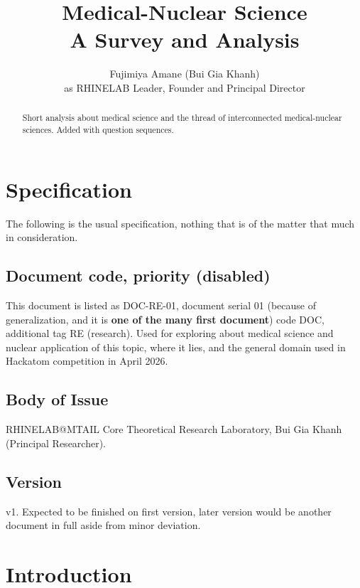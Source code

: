 \documentclass[9pt,a4paper]{article}
\title{\textbf{Medical-Nuclear Science \\ A Survey and Analysis}} %
\author{Fujimiya Amane (Bui Gia Khanh) \\ {\small as RHINELAB Leader, Founder and Principal Director}} %
\affiliation{} %
\begin{document}
\maketitle

\begin{abstract}
    \noindent
    Short analysis about medical science and the thread of interconnected medical-nuclear sciences. Added with question sequences. 
    
\end{abstract}

\vspace{2.5cm}

\thispagestyle{firstpage}

\pagebreak

\section{Specification}

The following is the usual specification, nothing that is of the matter that much in consideration. 

\subsection{Document code, priority (disabled)}

This document is listed as DOC-RE-01, document serial 01 (because of generalization, and it is \textbf{one of the many first document}) code DOC, additional tag RE (research). Used for exploring about medical science and nuclear application of this topic, where it lies, and the general domain used in Hackatom competition in April 2026. 

\subsection{Body of Issue}

RHINELAB@MTAIL Core Theoretical Research Laboratory, Bui Gia Khanh (Principal Researcher).

\subsection{Version}

v1. Expected to be finished on first version, later version would be another document in full aside from minor deviation. 

\section{Introduction}
\end{document}

